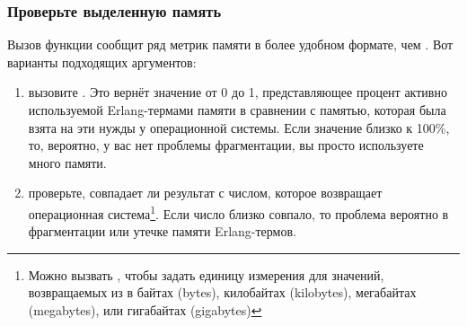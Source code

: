 \documentclass[11pt, oneside]{book}   	%
\begin{document}
\subsubsection{Проверьте выделенную память}

Вызов функции  сообщит ряд метрик памяти в более удобном формате, чем . Вот варианты подходящих аргументов:

\begin{enumerate}
	\item вызовите . Это вернёт значение от 0 до 1, представляющее процент активно используемой Erlang-термами памяти в сравнении с памятью, которая была взята на эти нужды у операционной системы. Если значение близко к 100\%, то, вероятно, у вас нет проблемы фрагментации, вы просто используете много памяти.
	\item проверьте, совпадает ли результат  с числом, которое возвращает операционная система\footnote{Можно вызвать , чтобы задать единицу измерения для значений, возвращаемых из  в байтах (bytes), килобайтах (kilobytes), мегабайтах (megabytes), или гигабайтах (gigabytes)}. Если число близко совпало, то проблема вероятно в фрагментации или утечке памяти Erlang-термов.
\end{enumerate}
\end{document}
